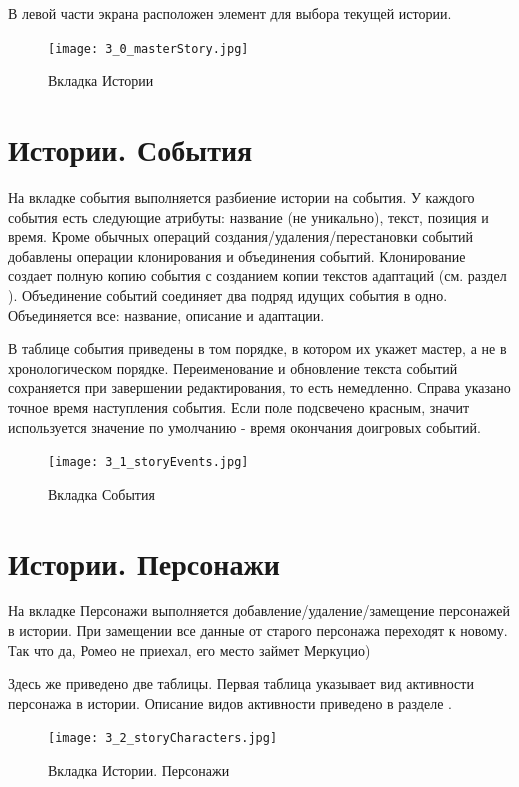 \documentclass[a4paper,oneside,10pt,russian]{sphinxmanual}
\begin{document}
В левой части экрана расположен элемент для выбора текущей истории.
\begin{figure}[H]
\centering
\capstart

\texttt{[image: 3\_0\_masterStory.jpg]}
\caption{Вкладка Истории}\end{figure}
\newpage

\section{Истории. События}
\label{pages:id8}\label{pages:story-events}
На вкладке события выполняется разбиение истории на события. У каждого события есть следующие атрибуты: название (не уникально), текст, позиция и время. Кроме обычных операций создания/удаления/перестановки событий добавлены операции клонирования и объединения событий. Клонирование создает полную копию события с созданием копии текстов адаптаций (см. раздел {\hyperref[pages:events-desc]{\emph{}}}). Объединение событий соединяет два подряд идущих события в одно. Объединяется все: название, описание и адаптации.

В таблице события приведены в том порядке, в котором их укажет мастер, а не в хронологическом порядке. Переименование и обновление текста событий сохраняется при завершении редактирования, то есть немедленно. Справа указано точное время наступления события. Если поле подсвечено красным, значит используется значение по умолчанию - время окончания доигровых событий.
\begin{figure}[H]
\centering
\capstart

\texttt{[image: 3\_1\_storyEvents.jpg]}
\caption{Вкладка События}\end{figure}
\newpage

\section{Истории. Персонажи}
\label{pages:story-characters}\label{pages:id9}
На вкладке Персонажи выполняется добавление/удаление/замещение персонажей в истории. При замещении все данные от старого персонажа переходят к новому. Так что да, Ромео не приехал, его место займет Меркуцио)

Здесь же приведено две таблицы. Первая таблица указывает вид активности персонажа в истории. Описание видов активности приведено в разделе {\hyperref[theory:secondary-entities-desc]{\emph{}}}.
\begin{figure}[H]
\centering
\capstart

\texttt{[image: 3\_2\_storyCharacters.jpg]}
\caption{Вкладка Истории. Персонажи}\end{figure}
\newpage
\end{document}
